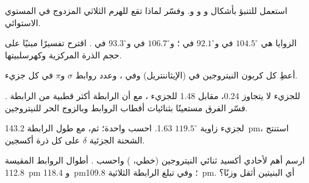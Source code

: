 \begin{exercise}[$\star\star$]\label{exo:b1:lewis-resonance-vsepr:7}
استعمل  للتنبؤ بأشكال  و و
و. وفسّر لماذا تقع  للهرم الثلاثي المزدوج في
المستوي الاستوائي.
\end{exercise}

\begin{exercise}[$\star\star$]\label{exo:b1:lewis-resonance-vsepr:8}
الزوايا  هي $104.5^\circ$ في  و$92.1^\circ$ في
؛ و$106.7^\circ$ في  و$93.3^\circ$ في . اقترح
تفسيرًا مبنيًا على حجم الذرة المركزية
وكهرسلبيتها.
\end{exercise}

\begin{exercise}[$\star\star$]\label{exo:b1:lewis-resonance-vsepr:9}
أعطِ  كل كربون  النيتروجين في
 (الإيثاننتريل) وفي ، وعدد روابط
$\sigma$ و$\pi$ في كل جزيء.
\end{exercise}

\begin{exercise}[$\star\star\star$]\label{exo:b1:lewis-resonance-vsepr:10}
 للجزيء  لا يتجاوز \qty{0.24}{\debye}، مقابل
\qty{1.48}{\debye} للجزيء ، مع أن الرابطة  أكثر قطبية
من الرابطة . فسّر الفرق مستعينًا بثنائيات أقطاب الروابط وبالزوج الحر
للنيتروجين.
\end{exercise}

\begin{exercise}[$\star\star\star$]\label{exo:b1:lewis-resonance-vsepr:11}
لجزيء  زاوية $119.5^\circ$ 
\qty{1.63}{\debye}. احسب   واحدة؛ ثم، مع
طول الرابطة \qty{143.2}{pm}، استنتج الشحنة الجزئية $\delta$ على كل
ذرة أكسجين.
\end{exercise}

\begin{exercise}[$\star\star\star$]\label{exo:b1:lewis-resonance-vsepr:12}
ارسم أهم  لأحادي أكسيد ثنائي النيتروجين 
(خطي، ) واحسب . أطوال الروابط
المقيسة  \qty{112.8}{pm} و \qty{118.4}{pm}؛ وفي
 تبلغ الرابطة الثلاثية \qty{109.8}{pm}. أي البنيتين أثقل
وزنًا؟
\end{exercise}

